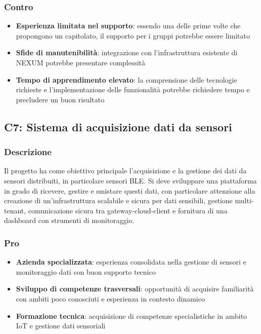 \documentclass[11pt,a4paper]{article}
\begin{document}
\subsubsection{Contro}
\begin{itemize}
    \item \textbf{Esperienza limitata nel supporto}: essendo una delle prime volte che propongono un capitolato, il supporto per i gruppi potrebbe essere limitato
    \item \textbf{Sfide di manutenibilità}: integrazione con l'infrastruttura esistente di NEXUM potrebbe presentare complessità
    \item \textbf{Tempo di apprendimento elevato}: la comprensione delle tecnologie richieste e l'implementazione delle funzionalità potrebbe richiedere tempo e precludere un buon risultato
\end{itemize}

\vspace{0.5cm}
\subsection{C7: Sistema di acquisizione dati da sensori}

\subsubsection{Descrizione}
Il progetto ha come obiettivo principale l'acquisizione e la gestione dei dati da sensori distribuiti, in particolare sensori BLE. Si deve sviluppare una piattaforma in grado di ricevere, gestire e smistare questi dati, con particolare attenzione alla creazione di un'infrastruttura scalabile e sicura per dati sensibili, gestione multi-tenant, comunicazione sicura tra gateway-cloud-client e fornitura di una dashboard con strumenti di monitoraggio.

\subsubsection{Pro}
\begin{itemize}
    \item \textbf{Azienda specializzata}: esperienza consolidata nella gestione di sensori e monitoraggio dati con buon supporto tecnico
    \item \textbf{Sviluppo di competenze trasversali}: opportunità di acquisire familiarità con ambiti poco conosciuti e esperienza in contesto dinamico
    \item \textbf{Formazione tecnica}: acquisizione di competenze specialistiche in ambito IoT e gestione dati sensoriali
\end{itemize}
\end{document}
